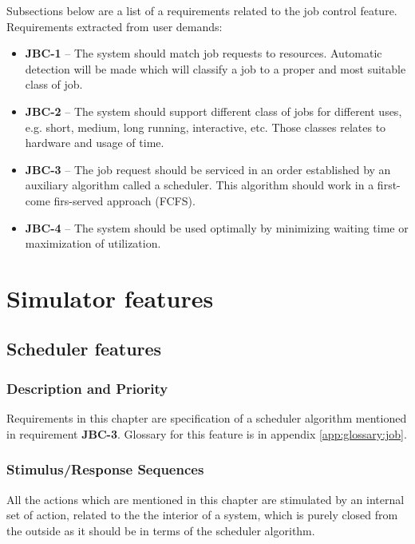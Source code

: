 \documentclass{report}
\begin{document}
Subsections below are a list of a requirements related to the job control feature.
Requirements extracted from user demands:
\begin{itemize}
	\item
	{
		\textbf{JBC-1} -- The system should match job requests to resources. Automatic detection will be made which will classify a job to a proper and most suitable class of job.
	}
	\item
	{
		\textbf{JBC-2} -- The system should support different class of jobs for different uses, e.g. short, medium, long running, interactive, etc. Those classes relates to hardware and usage of time.
	}
	\item
	{
		\textbf{JBC-3} -- The job request should be serviced in an order established by an auxiliary algorithm called a scheduler. This algorithm should work in a first-come firs-served approach (FCFS).
	}
	\item
	{
		\textbf{JBC-4} -- The system should be used optimally by minimizing waiting time or maximization of utilization.
	}
\end{itemize}


\chapter{Simulator features} \label{chp:sim}

\section{Scheduler features}

\subsection{Description and Priority}
Requirements in this chapter are specification of a scheduler algorithm mentioned in requirement \textbf{JBC-3}. Glossary for this feature is in appendix \ref{app:glossary:job}.

\subsection{Stimulus/Response Sequences}
All the actions which are mentioned in this chapter are stimulated by an internal set of action, related to the the interior of a system, which is purely closed from the outside as it should be in terms of the scheduler algorithm. 
\end{document}
